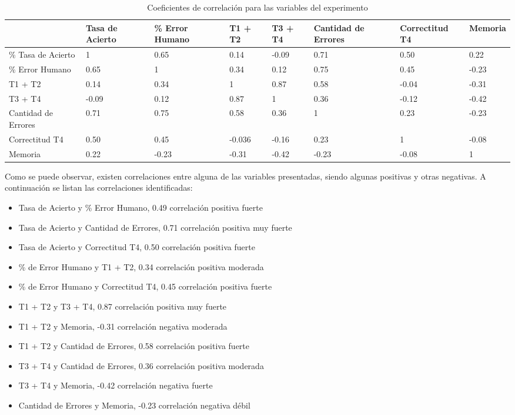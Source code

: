 \begin{table}[H]
\centering
\footnotesize
\begin{tabular}{|p{1.8cm}|p{1.6cm}|p{1.6cm}|p{1.6cm}|p{1.6cm}|p{1.6cm}|p{1.6cm}|p{1.6cm}|}
\hline
                    &    Tasa de Acierto & \% Error Humano & T1 + T2 & T3 + T4 & Cantidad de Errores & Correctitud T4 & Memoria \\
\hline
\% Tasa de Acierto     & 1 & 0.65 & 0.14 & -0.09 & 0.71 & 0.50 & 0.22 \\
\% Error Humano        & 0.65 & 1 & 0.34 & 0.12 & 0.75 & 0.45 & -0.23 \\
T1 + T2                & 0.14 & 0.34 & 1 & 0.87 & 0.58 & -0.04 & -0.31 \\
T3 + T4                & -0.09 & 0.12 & 0.87 & 1 & 0.36 & -0.12 & -0.42 \\
Cantidad de Errores    & 0.71 & 0.75 & 0.58 & 0.36 & 1 & 0.23 & -0.23 \\
Correctitud T4         & 0.50 & 0.45 & -0.036 & -0.16 & 0.23 & 1 & -0.08 \\
Memoria                & 0.22 & -0.23 & -0.31 & -0.42 & -0.23 & -0.08 & 1 \\
\hline
\end{tabular}
\caption{Coeficientes de correlaci\'on para las variables del experimento}
\label{sec:tabla-correlacion}
\end{table}

Como se puede observar, existen correlaciones entre alguna de las variables presentadas, siendo algunas positivas y otras negativas. A 
continuaci\'on se listan las correlaciones identificadas:

\begin{itemize}
    \item Tasa de Acierto y \% Error Humano, 0.49 correlaci\'on positiva fuerte
    \item Tasa de Acierto y Cantidad de Errores, 0.71 correlaci\'on positiva muy fuerte
    \item Tasa de Acierto y Correctitud T4, 0.50 correlaci\'on positiva fuerte 
    \item \% de Error Humano y T1 + T2, 0.34 correlaci\'on positiva moderada
    \item \% de Error Humano y Correctitud T4, 0.45 correlaci\'on positiva fuerte
    \item T1 + T2 y T3 + T4, 0.87 correlaci\'on positiva muy fuerte
    \item T1 + T2 y Memoria, -0.31 correlaci\'on negativa moderada
    \item T1 + T2 y Cantidad de Errores, 0.58 correlaci\'on positiva fuerte
    \item T3 + T4 y Cantidad de Errores, 0.36 correlaci\'on positiva moderada
    \item T3 + T4 y Memoria, -0.42 correlaci\'on negativa fuerte
    \item Cantidad de Errores y Memoria, -0.23 correlaci\'on negativa d\'ebil
\end{itemize}
